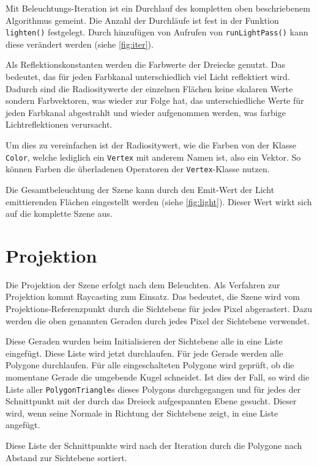 \documentclass[final,a4paper,11pt,notitlepage,halfparskip]{scrreprt}
\begin{document}
Mit Beleuchtungs-Iteration ist ein Durchlauf des kompletten oben beschriebenem Algorithmus
gemeint. Die Anzahl der Durchläufe ist fest in der Funktion \texttt{lighten()} 
festgelegt. Durch hinzufügen von Aufrufen von \texttt{runLightPass()} kann diese
verändert werden (siehe \ref{fig:iter}).

Als Reflektionskonstanten werden die Farbwerte der Dreiecke genutzt. Das
bedeutet, das für jeden Farbkanal unterschiedlich viel Licht reflektiert wird.
Dadurch sind die Radiositywerte der einzelnen Flächen keine skalaren Werte
sondern Farbvektoren, was wieder zur Folge hat, das unterschiedliche Werte für
jeden Farbkanal abgestrahlt und wieder aufgenommen werden, was farbige
Lichtreflektionen verursacht.

Um dies zu vereinfachen ist der Radiositywert, wie die Farben von der Klasse
\texttt{Color}, welche lediglich ein \texttt{Vertex} mit anderem Namen ist, also
ein Vektor. So können Farben die überladenen Operatoren der \texttt{Vertex}-Klasse 
nutzen.

Die Gesamtbeleuchtung der Szene kann durch den Emit-Wert der Licht emittierenden
Flächen eingestellt werden (siehe \ref{fig:light}). Dieser Wert wirkt sich auf
die komplette Szene aus.

\section{Projektion}\label{sec:proj}

Die Projektion der Szene erfolgt nach dem Beleuchten. Als Verfahren zur
Projektion kommt Raycasting zum Einsatz. Das bedeutet, die Szene wird vom
Projektions-Referenzpunkt durch die Sichtebene für jedes Pixel abgerastert. Dazu
werden die oben genannten Geraden durch jedes Pixel der Sichtebene verwendet.

Diese Geraden wurden beim Initialisieren der Sichtebene alle in eine Liste
eingefügt. Diese Liste wird jetzt durchlaufen. Für jede Gerade werden alle
Polygone durchlaufen. Für alle eingeschalteten Polygone wird geprüft, ob die
momentane Gerade die umgebende Kugel schneidet.  Ist dies der Fall, so wird die
Liste aller \texttt{PolygonTriangle}s dieses Polygons durchgegangen und für
jedes der Schnittpunkt mit der durch das Dreieck aufgespannten Ebene gesucht.
Dieser wird, wenn seine Normale in Richtung der Sichtebene zeigt, in eine Liste
angefügt. 

Diese Liste der Schnittpunkte wird nach der Iteration durch die Polygone nach
Abstand zur Sichtebene sortiert.
\end{document}
